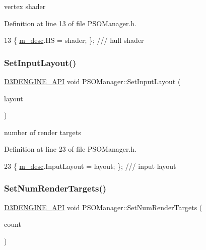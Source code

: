 vertex shader 



Definition at line 13 of file P\+S\+O\+Manager.\+h.


\begin{DoxyCode}
13 \{ \mbox{\hyperlink{class_p_s_o_manager_ac5a7e346b2d641709d7146f5a0f45dee}{m\_desc}}.HS = shader; \}; \textcolor{comment}{/// hull shader}
\end{DoxyCode}
\mbox{\label{class_p_s_o_manager_ab3ef568d2a3c5e02fdb3b2c490921b54}} 
\subsubsection{\texorpdfstring{Set\+Input\+Layout()}{SetInputLayout()}}
{\footnotesize\ttfamily \mbox{\hyperlink{stdafx_8h_a8ee2d990c5dfba7794dd2b60741d7722}{D3\+D\+E\+N\+G\+I\+N\+E\+\_\+\+A\+PI}} void P\+S\+O\+Manager\+::\+Set\+Input\+Layout (\begin{DoxyParamCaption}\item[{const D3\+D12\+\_\+\+I\+N\+P\+U\+T\+\_\+\+L\+A\+Y\+O\+U\+T\+\_\+\+D\+E\+SC}]{layout }\end{DoxyParamCaption})\hspace{0.3cm}{\ttfamily [inline]}}



number of render targets 



Definition at line 23 of file P\+S\+O\+Manager.\+h.


\begin{DoxyCode}
23 \{ \mbox{\hyperlink{class_p_s_o_manager_ac5a7e346b2d641709d7146f5a0f45dee}{m\_desc}}.InputLayout = layout; \};  \textcolor{comment}{/// input layout}
\end{DoxyCode}
\mbox{\label{class_p_s_o_manager_a41cbdf6b07c2dcbc9c740c9bc116adc5}} 
\subsubsection{\texorpdfstring{Set\+Num\+Render\+Targets()}{SetNumRenderTargets()}}
{\footnotesize\ttfamily \mbox{\hyperlink{stdafx_8h_a8ee2d990c5dfba7794dd2b60741d7722}{D3\+D\+E\+N\+G\+I\+N\+E\+\_\+\+A\+PI}} void P\+S\+O\+Manager\+::\+Set\+Num\+Render\+Targets (\begin{DoxyParamCaption}\item[{const int}]{count }\end{DoxyParamCaption})\hspace{0.3cm}{\ttfamily [inline]}}



